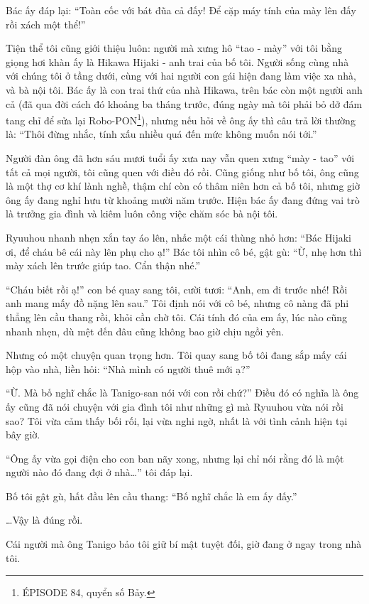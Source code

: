 \documentclass[../main.tex]{subfiles}
\begin{document}
Bác ấy đáp lại: ``Toàn cốc với bát đũa cả đấy! Để cặp máy tính của mày lên đấy rồi xách một thể!''

Tiện thể tôi cũng giới thiệu luôn: người mà xưng hô ``tao - mày'' với tôi bằng giọng hơi khàn ấy là Hikawa Hijaki - anh trai của bố tôi. Người sống cùng nhà với chúng tôi ở tầng dưới, cùng với hai người con gái hiện đang làm việc xa nhà, và bà nội tôi. Bác ấy là con trai thứ của nhà Hikawa, trên bác còn một người anh cả (đã qua đời cách đó khoảng ba tháng trước, đúng ngày mà tôi phải bỏ dở đám tang chỉ để sửa lại Robo-PON\footnote{{\flaregothic ÉPISODE 84}, quyển số Bảy.}), nhưng nếu hỏi về ông ấy thì câu trả lời thường là: ``Thôi đừng nhắc, tính xấu nhiều quá đến mức không muốn nói tới.''

Người đàn ông đã hơn sáu mươi tuổi ấy xưa nay vẫn quen xưng ``mày - tao'' với tất cả mọi người, tôi cũng quen với điều đó rồi. Cũng giống như bố tôi, ông cũng là một thợ cơ khí lành nghề, thậm chí còn có thâm niên hơn cả bố tôi, nhưng giờ ông ấy đang nghỉ hưu từ khoảng mười năm trước. Hiện bác ấy đang đứng vai trò là trưởng gia đình và kiêm luôn công việc chăm sóc bà nội tôi.

Ryuuhou nhanh nhẹn xắn tay áo lên, nhấc một cái thùng nhỏ hơn: ``Bác Hijaki ơi, để cháu bê cái này lên phụ cho ạ!'' Bác tôi nhìn cô bé, gật gù: ``Ừ, nhẹ hơn thì mày xách lên trước giúp tao. Cẩn thận nhé.''

``Cháu biết rồi ạ!'' con bé quay sang tôi, cười tươi: ``Anh, em đi trước nhé! Rồi anh mang mấy đồ nặng lên sau.'' Tôi định nói với cô bé, nhưng cô nàng đã phi thẳng lên cầu thang rồi, khỏi cần chờ tôi. Cái tính đó của em ấy, lúc nào cũng nhanh nhẹn, dù mệt đến đâu cũng không bao giờ chịu ngồi yên.

Nhưng có một chuyện quan trọng hơn. Tôi quay sang bố tôi đang sắp mấy cái hộp vào nhà, liền hỏi: ``Nhà mình có người thuê mới ạ?''

``Ừ. Mà bố nghĩ chắc là Tanigo-san nói với con rồi chứ?'' Điều đó có nghĩa là ông ấy cũng đã nói chuyện với gia đình tôi như những gì mà Ryuuhou vừa nói rồi sao? Tôi vừa cảm thấy bối rối, lại vừa nghi ngờ, nhất là với tình cảnh hiện tại bây giờ.

``Ông ấy vừa gọi điện cho con ban nãy xong, nhưng lại chỉ nói rằng đó là một người nào đó đang đợi ở nhà\dots'' tôi đáp lại.

Bố tôi gật gù, hất đầu lên cầu thang: ``Bố nghĩ chắc là em ấy đấy.''

\dots Vậy là đúng rồi.

Cái người mà ông Tanigo bảo tôi giữ bí mật tuyệt đối, giờ đang ở ngay trong nhà tôi.
\end{document}
